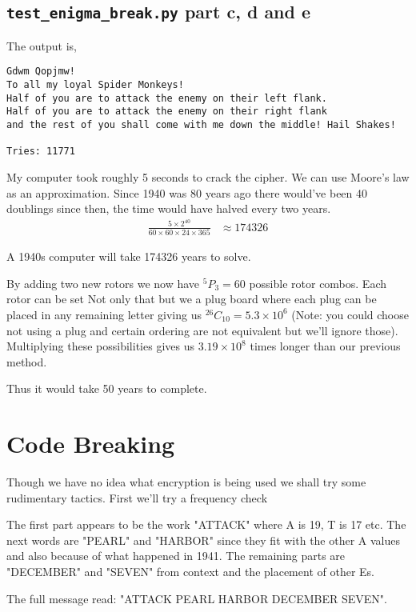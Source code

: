 \documentclass{article}
\begin{document}
\subsection{\texttt{test\_enigma\_break.py} part c, d and e}


The output is,
\begin{verbatim}
Gdwm Qopjmw!
To all my loyal Spider Monkeys!
Half of you are to attack the enemy on their left flank.
Half of you are to attack the enemy on their right flank
and the rest of you shall come with me down the middle! Hail Shakes!

Tries: 11771
\end{verbatim}

My computer took roughly 5 seconds to crack the cipher.
We can use Moore's law as an approximation. Since 1940 was 80 years ago
there would've been 40 doublings since then, the time would have halved
every two years.
\begin{align*}
    \frac{5 \times 2^40}{60\times60\times24\times365}
    &\approx 174326
\end{align*}

A 1940s computer will take 174326 years to solve.

By adding two new rotors we now have ${}^5P_3 = 60$ possible rotor combos. Each
rotor can be set
Not only that but we a plug board where each plug can be placed in
any remaining letter giving us ${}^{26}C_10 = 5.3 \times 10^6$ (Note: you could
choose not using a plug and certain ordering are not equivalent
but we'll ignore those).
Multiplying these possibilities gives us $3.19 \times 10^8$ times
longer than our previous method.

Thus it would take 50 years to complete.

\section{Code Breaking}
Though we have no idea what encryption is being used we shall try some
rudimentary tactics. First we'll try a frequency check

The first part appears to be the work "ATTACK" where A is 19, T is 17 etc.
The next words are "PEARL" and "HARBOR" since they fit with the other A values
and also because of what happened in 1941. The remaining parts are "DECEMBER"
and "SEVEN" from context and the placement of other Es.

The full message read: "ATTACK PEARL HARBOR DECEMBER SEVEN".
\end{document}
